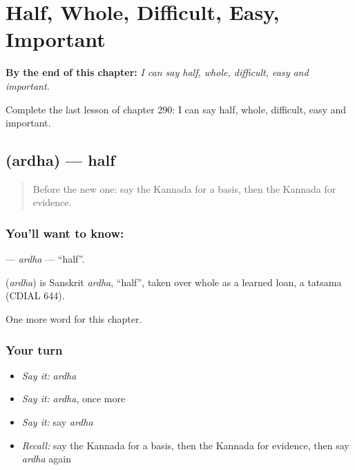 
\chapter{Half, Whole, Difficult, Easy, Important}
\label{ch:ka-half-whole-difficult-easy-important}

\begin{chapteropening}
\textbf{By the end of this chapter:} \emph{I can say half, whole, difficult, easy and important.}

Complete the last lesson of chapter 290: I can say half, whole, difficult, easy and important.
\end{chapteropening}

\section[\texorpdfstring{\kn{ಅರ್ಧ} (ardha)}{ಅರ್ಧ (ardha)}]{ (ardha) — half}

\label{lesson:KA-C290-ardha}



\begin{quote}
Before the new one: say the Kannada for a basis, then the Kannada for evidence.
\end{quote}

\subsection*{You'll want to know: }
\textbf{} — \emph{ardha} — \textquotedblleft{}half\textquotedblright{}.

\begin{cousinweb}
\textbf{} (\emph{ardha}) is Sanskrit \emph{ardha}, \textquotedblleft{}half\textquotedblright{}, taken over whole as a learned loan, a tatsama (CDIAL 644).
\end{cousinweb}

\begin{grammarlens}[title={What you've built}]
One more word for this chapter.
\end{grammarlens}

\subsection*{Your turn}
\begin{itemize}
\raggedright
  \item \emph{Say it:} \emph{ardha}
  \item \emph{Say it:} \emph{ardha}, once more
  \item \emph{Say it:} say \emph{ardha}
  \item \emph{Recall:} say the Kannada for a basis, then the Kannada for evidence, then say \emph{ardha} again
\end{itemize}

